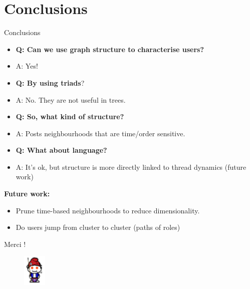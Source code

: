\documentclass{beamer}
\begin{document}
\section{Conclusions}
\begin{frame}{Conclusions}
	\begin{itemize}
	\item \textbf{Q: Can we use graph structure to characterise users?}
	\item A: Yes!
	\end{itemize}	
	\begin{itemize}
	\item \textbf{Q: By using triads}?
	\item A: No. They are not useful in trees.
	\end{itemize}
	\begin{itemize}
	\item \textbf{Q: So, what kind of structure?}
	\item A: Posts neighbourhoods that are time/order sensitive.
	\end{itemize}
	\begin{itemize}
	\item \textbf{Q: What about language?}
	\item A: It's ok, but structure is more directly linked to thread dynamics (future work)
	\end{itemize}
	\textbf{Future work:}
	\begin{itemize}
		\item Prune time-based neighbourhoods to reduce dimensionality.
		\item Do users jump from cluster to cluster (paths of roles)
	\end{itemize}	
\end{frame}

\begin{frame}
\begin{center}
\Huge Merci !
	\begin{figure}
		\centering
		\includegraphics[width=0.1\textwidth]{reddit_sans_culotte}
	\end{figure}
\end{center}
\end{frame}
\end{document}
